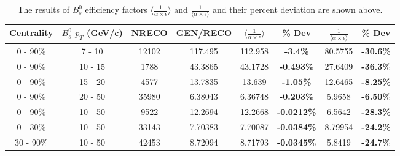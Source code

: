 \begin{table}[h]
\begin{center}
\caption{The results of $B^0_s$ efficiency factors $\langle \frac{1}{\alpha \times \epsilon} \rangle$ and $\frac{1}{\langle \alpha \times \epsilon \rangle}$ and their percent deviation are shown above.}
\vspace{1em}
\label{BsHighStat}
  \begin{tabular}{| c | c |c |c |c | c |  c| c|}
    \hline
     Centrality &  $B^0_s$  $p_T$ (GeV/c) & NRECO & GEN/RECO &  $\langle \frac{1}{\alpha \times \epsilon} \rangle$  & \% Dev & $\frac{1}{\langle \alpha \times \epsilon \rangle}$ &  \% Dev \\
    \hline
    \hline
0 - 90\% & 7 - 10 & 12102 & 117.495 & 112.958 & \textbf{-3.4\% }& 80.5755 &  \textbf{-30.6\% }   \\ 
0 - 90\% & 10 - 15 & 1788 & 43.3865 & 43.1728 & \textbf{-0.493\% }& 27.6409 &  \textbf{-36.3\% }   \\ 
0 - 90\% & 15 - 20 & 4577 & 13.7835 & 13.639 & \textbf{-1.05\% }& 12.6465 &  \textbf{-8.25\% }   \\ 
0 - 90\% & 20 - 50 & 35980 & 6.38043 & 6.36748 & \textbf{-0.203\% }& 5.9658 &  \textbf{-6.50\% }   \\ 
0 - 90\% & 10 - 50 & 9522 & 12.2694 & 12.2668 & \textbf{-0.0212\% }& 6.5642 &  \textbf{-28.3\% }   \\ 
0 - 30\% & 10 - 50 & 33143 & 7.70383 & 7.70087 & \textbf{-0.0384\% }& 8.79954 &  \textbf{-24.2\% }   \\ 
30 - 90\% & 10 - 50 & 42453 & 8.72094 & 8.71793 & \textbf{-0.0345\% }& 5.8419 &  \textbf{-24.7\% }   \\ 
    \hline
    \hline
\end{tabular}
\end{center}
\end{table}


